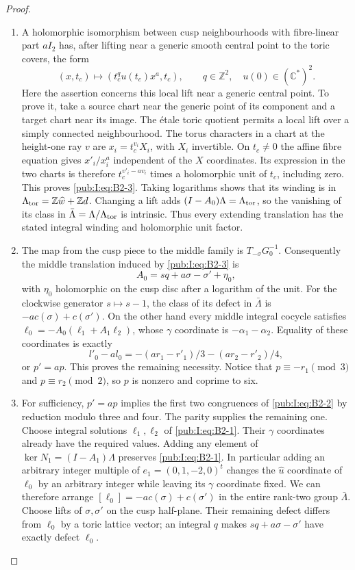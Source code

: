 \begin{proof}
\begin{enumerate}[label=\arabic*.,leftmargin=*]
\item A holomorphic isomorphism between cusp neighbourhoods with fibre-linear part $aI_2$ has, after lifting near a generic smooth central point to the toric covers, the form
\begin{equation}
 (x,t_c)\longmapsto(t_c^q u(t_c)x^a,t_c),\qquad q\in\mathbb Z^2,
 \quad u(0)\in(\mathbb C^*)^2.
\label{pub:I:eq:B2-3}
\end{equation}
Here the assertion concerns this local lift near a generic central point. To prove it, take a source chart near the generic point of its component and a target chart near its image. The \'etale toric quotient permits a local lift over a simply connected neighbourhood. The torus characters in a chart at the height-one ray $v$ are $x_i=t_c^{v_i}X_i$, with $X_i$ invertible. On $t_c\ne0$ the affine fibre equation gives $x'_i/x_i^a$ independent of the $X$ coordinates. Its expression in the two charts is therefore $t_c^{v'_i-av_i}$ times a holomorphic unit of $t_c$, including zero. This proves \eqref{pub:I:eq:B2-3}. Taking logarithms shows that its winding is in $\Lambda_{\rm tor}=\mathbb Z\widehat w+\mathbb Zd$. Changing a lift adds $(I-A_0)\Lambda=\Lambda_{\rm tor}$, so the vanishing of its class in $\bar\Lambda=\Lambda/\Lambda_{\rm tor}$ is intrinsic. Thus every extending translation has the stated integral winding and holomorphic unit factor.

\item The map from the cusp piece to the middle family is $T_{-\sigma}G_0^{-1}$. Consequently the middle translation induced by \eqref{pub:I:eq:B2-3} is
\[
 A_0=sq+a\sigma-\sigma'+\eta_0,
\]
with $\eta_0$ holomorphic on the cusp disc after a logarithm of the unit. For the clockwise generator $s\mapsto s-1$, the class of its defect in $\bar\Lambda$ is $-a c(\sigma)+c(\sigma')$. On the other hand every middle integral cocycle satisfies
$\ell_0=-A_0(\ell_1+A_1\ell_2)$, whose $\gamma$ coordinate is $-\alpha_1-\alpha_2$. Equality of these coordinates is exactly
\[
 l'_0-a l_0=-(ar_1-r'_1)/3-(ar_2-r'_2)/4,
\]
or $p'=ap$. This proves the remaining necessity. Notice that $p\equiv-r_1\pmod3$ and $p\equiv r_2\pmod2$, so $p$ is nonzero and coprime to six.

\item For sufficiency, $p'=ap$ implies the first two congruences of \eqref{pub:I:eq:B2-2} by reduction modulo three and four. The parity supplies the remaining one. Choose integral solutions $\ell_1,\ell_2$ of \eqref{pub:I:eq:B2-1}. Their $\gamma$ coordinates already have the required values. Adding any element of $\ker N_1=(I-A_1)\Lambda$ preserves \eqref{pub:I:eq:B2-1}. In particular adding an arbitrary integer multiple of $e_1=(0,1,-2,0)^t$ changes the $\widehat u$ coordinate of $\ell_0$ by an arbitrary integer while leaving its $\gamma$ coordinate fixed. We can therefore arrange
$[\ell_0]=-a c(\sigma)+c(\sigma')$ in the entire rank-two group $\bar\Lambda$. Choose lifts of $\sigma,\sigma'$ on the cusp half-plane. Their remaining defect differs from $\ell_0$ by a toric lattice vector; an integral $q$ makes $sq+a\sigma-\sigma'$ have exactly defect $\ell_0$.


\end{enumerate}
\end{proof}

